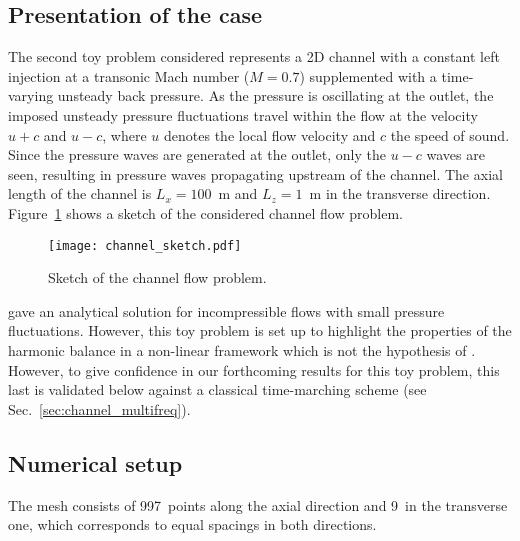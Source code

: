 \subsection{Presentation of the case}
\label{sub:presentation_of_the_case}

The second toy problem considered represents a 2D channel 
with a constant left injection at 
a transonic Mach number ($M=0.7$)
supplemented with a time-varying unsteady back pressure.
As the pressure is oscillating at the outlet, the imposed unsteady pressure
fluctuations travel within the flow at the velocity 
$u + c$ and $u - c$, where $u$ denotes 
the local flow velocity and $c$ the speed of sound.
Since the pressure waves are generated at the outlet, only
the $u-c$ waves are seen, resulting in pressure waves propagating
upstream of the channel. The axial length of the channel is $L_x = 100$~m
and $L_z = 1$~m in the transverse direction.
Figure~\ref{fig:canal_principle} shows a sketch
of the considered channel flow problem.
\begin{figure}[htb]
  \centering
  \texttt{[image: channel\_sketch.pdf]}
  \caption{Sketch of the channel flow problem.}
  \label{fig:canal_principle}
\end{figure}

\citet{Merkle1987} gave an analytical solution
for incompressible flows with small pressure fluctuations.
However, this toy problem is set up to highlight the properties
of the harmonic balance in a non-linear framework which is not
the hypothesis of \citet{Merkle1987}. However, to give confidence
in our forthcoming results for this toy problem,
this last is validated below against a classical time-marching scheme
(see Sec.~\ref{sec:channel_multifreq}).

\subsection{Numerical setup}

The mesh consists of 997~points along the axial direction and 9~in the
transverse one, which corresponds to equal spacings in both
directions. 

